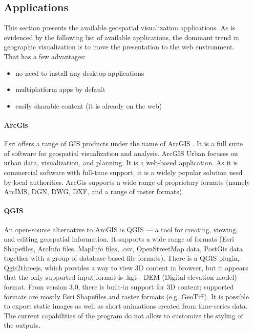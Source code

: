 \subsection{Applications}
This section presents the available geospatial visualization applications. As is evidenced by the following list of available applications, the dominant trend in geographic visualization is to move the presentation to the web environment. That has a few advantages:
\begin{itemize}
    \item no need to install any desktop applications
    \item multiplatform apps by default
    \item easily sharable content (it is already on the web)
\end{itemize}

\paragraph{ArcGis} 
Esri offers a range of GIS products under the name of ArcGIS \cite{esriArcgis}. It is a full suite of software for geospatial visualization and analysis. ArcGIS Urban focuses on urban data, visualization, and planning. It is a web-based application. As it is commercial software with full-time support, it is a widely popular solution used by local authorities. ArcGis supports a wide range of proprietary formats (namely ArcIMS, DGN, DWG, DXF, and a range of raster formats). 

\paragraph{QGIS} An open-source alternative to ArcGIS is QGIS \cite{QGISsoftware} --- a tool for creating, viewing, and editing geospatial information. It supports a wide range of formats (Esri Shapefiles, ArcInfo files, MapInfo files, .csv, OpenStreetMap data, PostGis data together with a group of database-based file formats). There is a QGIS plugin, Qgis2threejs, which provides a way to view 3D content in browser, but it appears that the only supported input format is .hgt - DEM (Digital elevation model) format. From version 3.0, there is built-in support for 3D content; supported formats are mostly Esri Shapefiles and raster formats (e.g. GeoTiff). It is possible to export static images as well as short animations created from time-series data. The current capabilities of the program do not allow to customize the styling of the outputs. 

